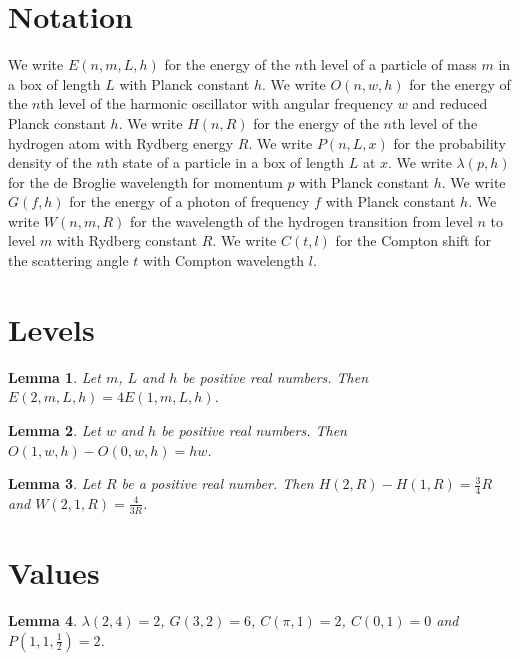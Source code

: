 \documentclass{article}
\newtheorem{lemma}{Lemma}
\begin{document}
\section{Notation}

We write $E(n,m,L,h)$ for the energy of the $n$th level of a particle of mass $m$ in a box of length $L$ with Planck constant $h$.
We write $O(n,w,h)$ for the energy of the $n$th level of the harmonic oscillator with angular frequency $w$ and reduced Planck constant $h$.
We write $H(n,R)$ for the energy of the $n$th level of the hydrogen atom with Rydberg energy $R$.
We write $P(n,L,x)$ for the probability density of the $n$th state of a particle in a box of length $L$ at $x$.
We write $\lambda(p,h)$ for the de Broglie wavelength for momentum $p$ with Planck constant $h$.
We write $G(f,h)$ for the energy of a photon of frequency $f$ with Planck constant $h$.
We write $W(n,m,R)$ for the wavelength of the hydrogen transition from level $n$ to level $m$ with Rydberg constant $R$.
We write $C(t,l)$ for the Compton shift for the scattering angle $t$ with Compton wavelength $l$.

\section{Levels}

\begin{lemma}\label{box}
Let $m$, $L$ and $h$ be positive real numbers. Then $E(2,m,L,h)=4E(1,m,L,h)$.
\end{lemma}

\begin{lemma}\label{oscillator}
Let $w$ and $h$ be positive real numbers. Then $O(1,w,h)-O(0,w,h)=hw$.
\end{lemma}

\begin{lemma}\label{hydrogen}
Let $R$ be a positive real number. Then $H(2,R)-H(1,R)=\frac34R$ and $W(2,1,R)=\frac{4}{3R}$.
\end{lemma}

\section{Values}

\begin{lemma}\label{values}
$\lambda(2,4)=2$, $G(3,2)=6$, $C(\pi,1)=2$, $C(0,1)=0$ and $P(1,1,\frac12)=2$.
\end{lemma}
\end{document}
